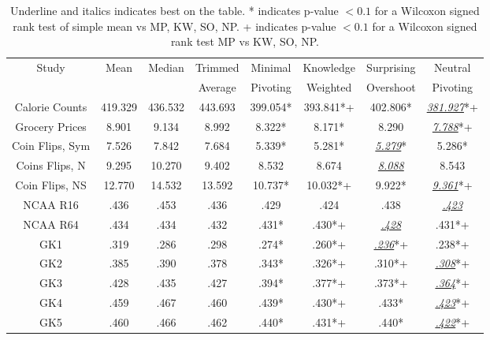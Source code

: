 \begin{table}[h]
    \centering
    \begin{tabular}{c|c|c|c|c|c|c|c}
        Study & Mean & Median & Trimmed & Minimal & Knowledge &Surprising& Neutral  \\ 
        &&&Average&Pivoting&Weighted& Overshoot &Pivoting  \\ \hline
        Calorie Counts&     419.329 &   436.532    &  443.693 & 399.054*    & 393.841*+  & 402.806* &\underline{\textit{381.927}}*+ \\
        Grocery Prices&     8.901&      9.134        &  8.992 &  8.322*   &  8.171*             & 8.290& \underline{\textit{7.788}}*+\\
        Coin Flips, Sym&    7.526 &     7.842       &  7.684 &  5.339*  &  5.281*               & \underline{\textit{5.279}}*&5.286*\\
        Coins Flips, N&     9.295&      10.270       &  9.402 & 8.532   &  8.674    &\underline{\textit{8.088}}           & 8.543\\
        Coin Flips, NS&     12.770 &    14.532         &  13.592 & 10.737*  &  10.032*+      &9.922*    & \underline{\textit{9.361}}*+\\
        NCAA R16&           .436&       .453                  &  .436 & .429  &  .424         & .438&\underline{\textit{.423}}\\
        NCAA R64&           .434&       .434                 &  .432 & .431*  &  .430*+ & \underline{\textit{.428}} &.431*+\\
        GK1&                .319 &      .286 &  .298    & .274*     &  .260*+     &      \underline{\textit{.236}}*+          &.238*+\\
        GK2&                .385 &      .390 &  .378    & .343*    & .326*+          & .310*+          & \underline{\textit{.308}}*+\\
        GK3&                .428&       .435 &  .427    & .394*    &  .377*+  & .373*+                  &\underline{\textit{.364}}*+\\
        GK4&                .459&       .467 &  .460    &  .439*    &  .430*+   &.433*               &\underline{\textit{.423}}*+\\
        GK5&                .460&       .466 &  .462    &  .440*    &  .431*+    & .440*               &\underline{\textit{.422}}*+\\
    \end{tabular}
    \caption{Underline and italics indicates best on the table. * indicates p-value $<0.1$ for a Wilcoxon signed rank test of simple mean vs MP, KW, SO, NP. + indicates p-value $<0.1$ for a Wilcoxon signed rank test MP vs KW, SO, NP.}
    \label{tab:results}
\end{table}

